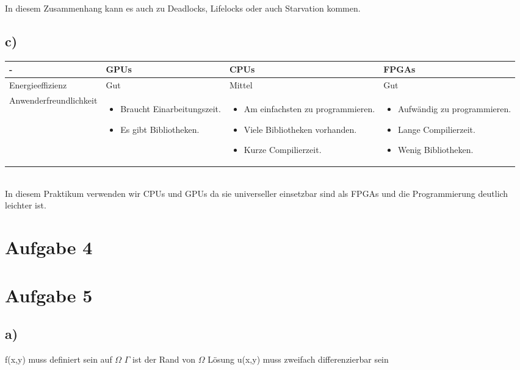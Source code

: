 \documentclass{article}
\begin{document}
        In diesem Zusammenhang kann es auch zu Deadlocks, Lifelocks oder auch Starvation kommen. 
        \subsection{c)}
        \begin{tabular}{|p{4cm}|p{3cm}|p{3cm}|p{3cm}|}
        	\hline
        	- & GPUs & CPUs & FPGAs \\
        	\hline
        	Energieeffizienz & Gut & Mittel & Gut  \\
        	\hline
        	Anwenderfreundlichkeit & \begin{itemize}
        		\item Braucht Einarbeitungszeit.
        		\item Es gibt Bibliotheken.
        	\end{itemize} & 
        \begin{itemize}
        	\item Am einfachsten zu programmieren.
        	\item Viele Bibliotheken vorhanden. 
        	\item Kurze Compilierzeit.
        \end{itemize}  & \begin{itemize}
        \item Aufwändig zu programmieren.
        \item Lange Compilierzeit.
        \item Wenig Bibliotheken.
    \end{itemize}  \\
        	\hline
        \end{tabular}\\
    
    In diesem Praktikum verwenden wir CPUs und GPUs da sie universeller einsetzbar sind als FPGAs und die Programmierung deutlich leichter ist.

    \section{Aufgabe 4}

    \section{Aufgabe 5}
	\subsection{a)}
	f(x,y) muss definiert sein auf $\Omega$ \newline
	$\Gamma$ ist der Rand von $\Omega$  \newline
	L\"{o}sung u(x,y) muss zweifach differenzierbar sein 
\end{document}
